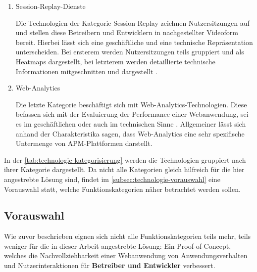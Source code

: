 \begin{enumerate}
	\item Session-Replay-Dienste
	\par Die Technologien der Kategorie Session-Replay zeichnen Nutzersitzungen auf und stellen diese Betreibern und Entwicklern in nachgestellter Videoform bereit. Hierbei lässt sich eine geschäftliche und eine technische Repräsentation unterscheiden. Bei ersterem werden Nutzersitzungen teils gruppiert und als Heatmaps dargestellt, bei letzterem werden detaillierte technische Informationen mitgeschnitten und dargestellt \cite{Webalyt}.
	
	\item Web-Analytics
	\par Die letzte Kategorie beschäftigt sich mit Web-Analytics-Technologien. Diese befassen sich mit der Evaluierung der Performance einer Webanwendung, sei es im geschäftlichen oder auch im technischen Sinne \cite{APracticalEvaluationOfWebAnalytics} \cite{WebAnalyticsAnHourADay}. Allgemeiner lässt sich anhand der Charakteristika sagen, dass Web-Analytics eine sehr spezifische Untermenge von APM-Plattformen darstellt.
	
\end{enumerate}

In der \autoref{tab:technologie-kategorisierung} werden die Technologien gruppiert nach ihrer Kategorie dargestellt. Da nicht alle Kategorien gleich hilfreich für die hier angestrebte Lösung sind, findet im \autoref{subsec:technologie-vorauswahl} eine Vorauswahl statt, welche Funktionskategorien näher betrachtet werden sollen.



\subsection{Vorauswahl}
\label{subsec:technologie-vorauswahl}

Wie zuvor beschrieben eignen sich nicht alle Funktionskategorien teils mehr, teils weniger für die in dieser Arbeit angestrebte Lösung: Ein Proof-of-Concept, welches die Nachvollziehbarkeit einer Webanwendung von Anwendungsverhalten und Nutzerinteraktionen für \textbf{Betreiber und Entwickler} verbessert.

